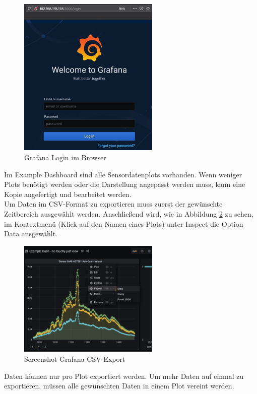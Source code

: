 \begin{figure}[H]
\centering
\includegraphics[width=0.6\textwidth]{img/handbuch/grafna_login}
\caption{Grafana Login im Browser}
\label{fig:grafna_login}
\end{figure}
Im Example Dashboard sind alle Sensordatenplots vorhanden. Wenn weniger Plots benötigt werden oder die Darstellung angepasst werden muss, kann eine Kopie angefertigt und bearbeitet werden.\\
Um Daten im CSV-Format zu exportieren muss zuerst der gewünschte Zeitbereich ausgewählt werden.
Anschließend wird, wie in Abbildung \ref{fig:export_data} zu sehen, im Kontextmenü (Klick auf den Namen eines Plots) unter Inspect die Option Data ausgewählt. 

\begin{figure}[H]
\centering
\includegraphics[width=0.6\textwidth]{img/handbuch/Export_Data}
\caption{Screenshot Grafana CSV-Export}
\label{fig:export_data}
\end{figure}
\noindent Daten können nur pro Plot exportiert werden. Um mehr Daten auf einmal zu exportieren, müssen alle gewünschten Daten in einem Plot vereint werden.

